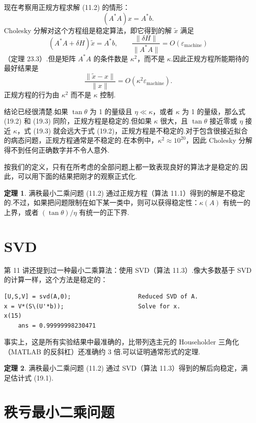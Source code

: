 \documentclass[UTF8,fontset=none,12pt]{ctexart}
\newcommand{\epsmach}{\varepsilon_{\mathrm{machine}}}
\theoremstyle{definition}
\newtheorem{theorem}{定理}
\begin{document}
现在考察用正规方程求解 (11.2) 的情形：
\[
(A^*A)x=A^*b.
\]
Cholesky 分解对这个方程组是稳定算法，即它得到的解 $\widetilde x$ 满足
\[
(A^*A+\delta H)\widetilde x=A^*b,
\qquad \frac{\|\delta H\|}{\|A^*A\|}=O(\epsmach)
\]
（定理 23.3）.但是矩阵 $A^*A$ 的条件数是 $\kappa^2$，而不是 $\kappa$.因此正规方程所能期待的最好结果是
\begin{equation}
    \frac{\|\widetilde x-x\|}{\|x\|}=O(\kappa^2\epsmach).
    \tag{19.3}
\end{equation}
正规方程的行为由 $\kappa^2$ 而不是 $\kappa$ 控制.

结论已经很清楚.如果 $\tan\theta$ 为 1 的量级且 $\eta\ll\kappa$，或者 $\kappa$ 为 1 的量级，那么式 (19.2) 和 (19.3) 同阶，正规方程是稳定的.但如果 $\kappa$ 很大，且 $\tan\theta$ 接近零或 $\eta$ 接近 $\kappa$，式 (19.3) 就会远大于式 (19.2)，正规方程是不稳定的.对于包含很接近拟合的病态问题，正规方程通常是不稳定的.在本例中，$\kappa^2\approx10^{20}$，因此 Cholesky 分解得不到任何正确数字并不令人意外.

按我们的定义，只有在所考虑的全部问题上都一致表现良好的算法才是稳定的.因此，可以用下面的结果把刚才的观察正式化.

\begin{theorem}
满秩最小二乘问题 (11.2) 通过正规方程（算法 11.1）得到的解是不稳定的.不过，如果把问题限制在如下某一类中，则可以获得稳定性：$\kappa(A)$ 有统一的上界，或者 $(\tan\theta)/\eta$ 有统一的正下界.
\end{theorem}

\section*{SVD}

第 11 讲还提到过一种最小二乘算法：使用 SVD（算法 11.3）.像大多数基于 SVD 的计算一样，这个方法是稳定的：

\begin{verbatim}
[U,S,V] = svd(A,0);                   Reduced SVD of A.
x = V*(S\(U'*b));                     Solve for x.
x(15)
    ans = 0.99999998230471
\end{verbatim}

事实上，这是所有实验结果中最准确的，比带列选主元的 Householder 三角化（MATLAB 的反斜杠）还准确约 3 倍.可以证明通常形式的定理.

\begin{theorem}
满秩最小二乘问题 (11.2) 通过 SVD（算法 11.3）得到的解后向稳定，满足估计式 (19.1).
\end{theorem}

\section*{秩亏最小二乘问题}
\end{document}
